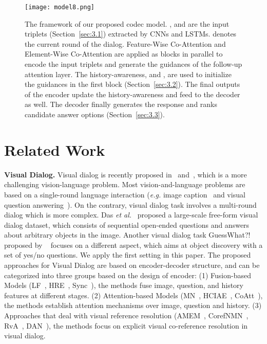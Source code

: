 \documentclass[10pt,twocolumn,letterpaper]{article}
\begin{document}
\begin{figure*}[t]
\begin{center}
\texttt{[image: model8.png]}
\end{center}
    \caption{The framework of our proposed codec model. ,  and  are the input triplets (Section~\ref{sec:3.1}) extracted by CNNs and LSTMs.  denotes the current round of the dialog. Feature-Wise Co-Attention and Element-Wise Co-Attention are applied as blocks in parallel to encode the input triplets and generate the guidances of the follow-up attention layer. The history-awareness,  and , are used to initialize the guidances in the first block (Section~\ref{sec:3.2}). The final outputs of the encoder update the history-awareness and feed to the decoder as well. The decoder finally generates the response and ranks candidate answer options (Section~\ref{sec:3.3}).
    }
\label{fig:model}
\end{figure*}


\section{Related Work}\label{sec 2}

\noindent\textbf{Visual Dialog.} Visual dialog is recently proposed in~\cite{das2017visual} and~\cite{de2017guesswhat}, which is a more challenging vision-language problem. Most vision-and-language problems are based on a single-round language interaction (\emph{e.g.} image caption~\cite{donahue2015long,fang2015captions,karpathy2015deep,anderson2017bottom} and visual question answering~\cite{anderson2017bottom,agrawal2016sort,antol2015vqa,das2017human,lu2016hierarchical}). On the contrary, visual dialog task involves a multi-round dialog which is more complex. Das \textit{et al.}~\cite{das2017visual} proposed a large-scale free-form visual dialog dataset, which consists of sequential open-ended questions and answers about arbitrary objects in the image. Another visual dialog task GuessWhat?! proposed by ~\cite{de2017guesswhat} focuses on a different aspect, which aims at object discovery with a set of yes/no questions. We apply the first setting in this paper. The proposed approaches for Visual Dialog are based on encoder-decoder structure, and can be categorized into three groups based on the design of encoder: (1) Fusion-based Models (LF~\cite{das2017visual}, HRE~\cite{das2017visual}, Sync~\cite{guo2019image}), the methods fuse image, question, and history features at different stages. (2) Attention-based Models (MN~\cite{das2017visual}, HCIAE~\cite{lu2017best}, CoAtt~\cite{lu2016hierarchical}), the methods
establish attention mechanisms over image, question and history. (3) Approaches that deal with visual reference resolution (AMEM~\cite{seo2017visual}, CorefNMN~\cite{kottur2018visual}, RvA~\cite{kang2019dual}, DAN~\cite{kang2019dual}), the methods focus on explicit visual co-reference resolution in visual dialog.
\end{document}
